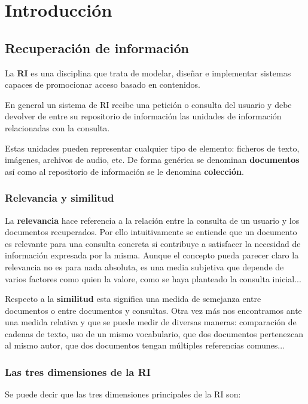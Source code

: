 \chapter{Introducción}
\section{Recuperación de información}
La \textbf{\acrfull{RI}} es una disciplina que trata de modelar, diseñar e implementar sistemas capaces de promocionar acceso basado en contenidos. \cite{RIspaBook}

En general un sistema de \acrshort{RI} recibe una petición o consulta  del usuario y debe devolver de entre su repositorio de información las unidades de información relacionadas con la consulta. 

Estas unidades pueden representar cualquier tipo de elemento: ficheros de texto, imágenes, archivos de audio, etc. De forma genérica se denominan \textbf{documentos} así como al repositorio de información se le denomina \textbf{colección}.


\subsection{Relevancia y similitud}
La \textbf{relevancia} hace referencia a la relación entre la consulta de un usuario y los documentos recuperados. Por ello intuitivamente se entiende que un documento es relevante para una consulta concreta si contribuye a satisfacer la necesidad de información expresada por la misma. Aunque el concepto pueda parecer claro la relevancia no es para nada absoluta, es una media subjetiva que depende de varios factores como quien la valore, como se haya planteado la consulta inicial...

Respecto a la \textbf{similitud} esta significa una medida de semejanza entre documentos o entre documentos y consultas. Otra vez más nos encontramos ante una medida relativa y que se puede medir de diversas maneras: comparación de cadenas de texto, uso de un mismo vocabulario, que dos documentos pertenezcan al mismo autor, que dos documentos tengan múltiples referencias comunes...\cite{ApuntesRI}


\subsection{Las tres dimensiones de la \acrshort{RI}}
Se puede decir que las tres dimensiones principales de la \acrshort{RI} son:\cite{RIspaBook}

